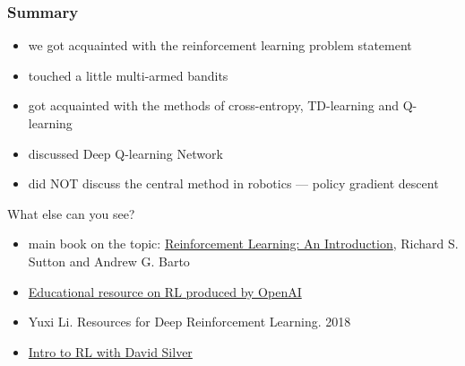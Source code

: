 \documentclass[fullscreen=true, bookmarks=true, hyperref={pdfencoding=unicode}]{beamer}
\begin{document}
\begin{frame}[t]
\frametitle{Summary}

  \begin{itemize}
    \item we got acquainted with the reinforcement learning problem statement
    \item touched a little multi-armed bandits
    \item got acquainted with the methods of cross-entropy, TD-learning and Q-learning
    \item discussed Deep Q-learning Network
    \item did NOT discuss the central method in robotics — policy gradient descent
  \end{itemize}

  \pause
  What else can you see?

  \begin{itemize}
    \item main book on the topic: \href{https://web.stanford.edu/class/psych209/Readings/SuttonBartoIPRLBook2ndEd.pdf}{Reinforcement Learning: An Introduction}, Richard S. Sutton and Andrew G. Barto
    \item \href{https://spinningup.openai.com/en/latest}{Educational resource on RL produced by OpenAI}
    \item Yuxi Li. Resources for Deep Reinforcement Learning. 2018
    \item \href{https://www.deepmind.com/learning-resources/introduction-to-reinforcement-learning-with-david-silver}{Intro to RL with David Silver}
  \end{itemize}
\end{frame}
\end{document}

